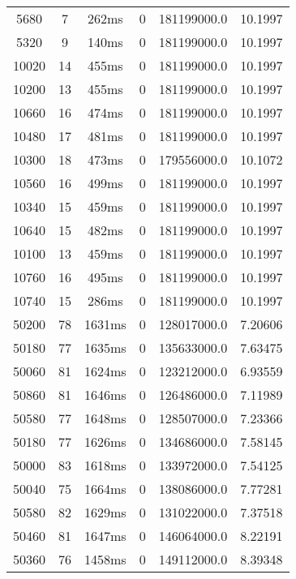 \documentclass[./main.tex]{subfiles}
\begin{document}
\begin{table}
\begin{tabular}{ c | c | c | c | c | c }
        \rowcolor{lightgray} 5680 & 7 & 262ms & 0 & 181199000.0 & 10.1997 \\
        \rowcolor{lightgray} 5320 & 9 & 140ms & 0 & 181199000.0 & 10.1997 \\
        \hline
        \rowcolor{lightgray} 10020 & 14 & 455ms & 0 & 181199000.0 & 10.1997 \\
        \rowcolor{lightgray} 10200 & 13 & 455ms & 0 & 181199000.0 & 10.1997 \\
        \rowcolor{lightgray} 10660 & 16 & 474ms & 0 & 181199000.0 & 10.1997 \\
        \rowcolor{lightgray} 10480 & 17 & 481ms & 0 & 181199000.0 & 10.1997 \\
        10300 & 18 & 473ms & 0 & 179556000.0 & 10.1072 \\
        \rowcolor{lightgray} 10560 & 16 & 499ms & 0 & 181199000.0 & 10.1997 \\
        \rowcolor{lightgray} 10340 & 15 & 459ms & 0 & 181199000.0 & 10.1997 \\
        \rowcolor{lightgray} 10640 & 15 & 482ms & 0 & 181199000.0 & 10.1997 \\
        \rowcolor{lightgray} 10100 & 13 & 459ms & 0 & 181199000.0 & 10.1997 \\
        \rowcolor{lightgray} 10760 & 16 & 495ms & 0 & 181199000.0 & 10.1997 \\
        \rowcolor{lightgray} 10740 & 15 & 286ms & 0 & 181199000.0 & 10.1997 \\
        \hline
        50200 & 78 & 1631ms & 0 & 128017000.0 & 7.20606 \\
        50180 & 77 & 1635ms & 0 & 135633000.0 & 7.63475 \\
        50060 & 81 & 1624ms & 0 & 123212000.0 & 6.93559 \\
        50860 & 81 & 1646ms & 0 & 126486000.0 & 7.11989 \\
        50580 & 77 & 1648ms & 0 & 128507000.0 & 7.23366 \\
        50180 & 77 & 1626ms & 0 & 134686000.0 & 7.58145 \\
        \rowcolor{lightgray} 50000 & 83 & 1618ms & 0 & 133972000.0 & 7.54125 \\
        50040 & 75 & 1664ms & 0 & 138086000.0 & 7.77281 \\
        50580 & 82 & 1629ms & 0 & 131022000.0 & 7.37518 \\
        50460 & 81 & 1647ms & 0 & 146064000.0 & 8.22191 \\
        50360 & 76 & 1458ms & 0 & 149112000.0 & 8.39348 \\

\end{tabular}
\end{table}
\end{document}
